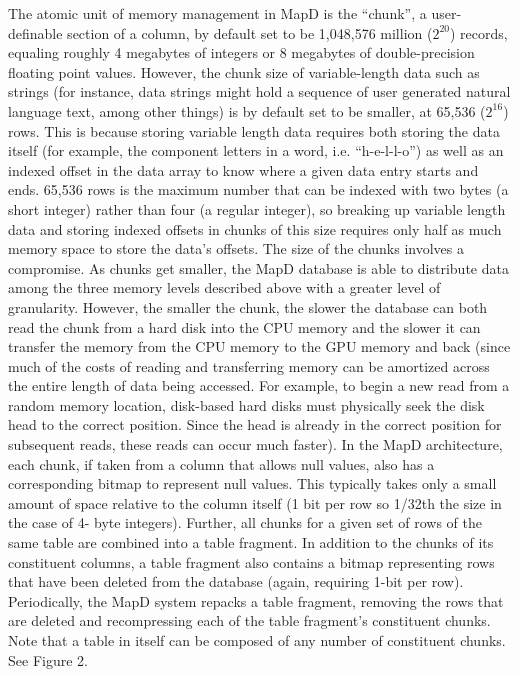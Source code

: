 \documentclass[twocolumn]{article}
\begin{document}

The atomic unit of memory management in MapD is the “chunk”, a user-definable section of a column, by default set to be 1,048,576 million ($2^20$) records, equaling roughly 4 megabytes of integers or 8 megabytes of double-precision floating point values. However, the chunk size of variable-length data such as strings (for instance, data strings might hold a sequence of user generated natural language text, among other things) is by default set to be smaller, at 65,536 ($2^16$) rows. This is because storing variable length data requires both storing the data itself (for example, the component letters in a word, i.e. “h-e-l-l-o”) as well as an indexed offset in the data array to know where a given data entry starts and ends. 65,536 rows is the maximum number that can be indexed with two bytes (a short integer) rather than four (a regular integer), so breaking up variable length data and storing indexed offsets in chunks of this size requires only half as much memory space to store the data’s offsets.
The size of the chunks involves a compromise. As chunks get smaller, the MapD database is able to distribute data among the three memory levels described above with a greater level of granularity. However, the smaller the chunk, the slower the database can both read the chunk from a hard disk into the CPU memory and the slower it can transfer the
memory from the CPU memory to the GPU memory and back (since much of the costs of reading and transferring memory can be amortized across the entire length of data being accessed. For example, to begin a new read from a random memory location, disk-based hard disks must physically seek the disk head to the correct position. Since the head is already in the correct position for subsequent reads, these reads can occur much faster).
In the MapD architecture, each chunk, if taken from a column that allows null values, also has a corresponding bitmap to represent null values. This typically takes only a small amount of space relative to the column itself (1 bit per row so 1/32th the size in the case of 4- byte integers). Further, all chunks for a given set of rows of the same table are combined into a table fragment. In addition to the chunks of its constituent columns, a table fragment also contains a bitmap representing rows that have been deleted from the database (again, requiring 1-bit per row). Periodically, the MapD system repacks a table fragment, removing the rows that are deleted and recompressing each of the table fragment’s constituent chunks. Note that a table in itself can be composed of any number of constituent chunks. See Figure 2.
\end{document}
